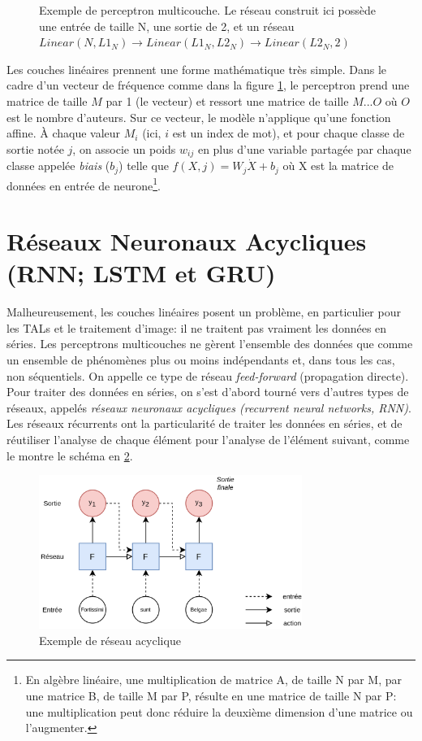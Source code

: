 \begin{figure}[h]
\begin{minipage}{.60\linewidth}
        \caption{Exemple de perceptron multicouche. Le réseau construit ici possède une entrée de taille N, une sortie de 2, et un réseau $Linear(N, L1_N) \rightarrow Linear(L1_N, L2_N) \rightarrow Linear(L2_N, 2)$}
        \label{fig:deep-learning:mlp}
    \end{minipage}%
\end{figure}

Les couches linéaires prennent une forme mathématique très simple. Dans le cadre d'un vecteur de fréquence comme dans la figure \ref{fig:deep-learning:mlp}, le perceptron prend une matrice de taille $M$ par 1 (le vecteur) et ressort une matrice de taille $M...O$ où $O$ est le nombre d'auteurs. Sur ce vecteur, le modèle n'applique qu'une fonction affine. À chaque valeur $M_{i}$ (ici, $i$ est un index de mot), et pour chaque classe de sortie notée $j$, on associe un poids $w_{ij}$ en plus d'une variable partagée par chaque classe appelée \textit{biais} ($b_{j}$) telle que $f(X, j) = W_{j} \dot X + b_{j}$  où X est la matrice de données en entrée de neurone\footnote{En algèbre linéaire, une multiplication de matrice A, de taille N par M, par une matrice B, de taille M par P, résulte en une matrice de taille N par P: une multiplication peut donc réduire la deuxième dimension d'une matrice ou l'augmenter.}.


\section{Réseaux Neuronaux Acycliques (RNN; LSTM et GRU)}

Malheureusement, les couches linéaires posent un problème, en particulier pour les TALs et le traitement d'image: il ne traitent pas vraiment les données en séries. Les perceptrons multicouches ne gèrent l'ensemble des données que comme un ensemble de phénomènes plus ou moins indépendants et, dans tous les cas, non séquentiels. On appelle ce type de réseau \textit{feed-forward} (propagation directe). Pour traiter des données en séries, on s'est d'abord tourné vers d'autres types de réseaux, appelés \textit{réseaux neuronaux acycliques (recurrent neural networks, RNN)}. Les réseaux récurrents ont la particularité de traiter les données en séries, et de réutiliser l'analyse de chaque élément pour l'analyse de l'élément suivant, comme le montre le schéma en \ref{fig:deep-learning:rnn}.

\begin{figure}[h]
    \centering
    \includegraphics[height=5cm]{figures/chap2/RNN.png}
    \caption{Exemple de réseau acyclique}
    \label{fig:deep-learning:rnn}
\end{figure}

